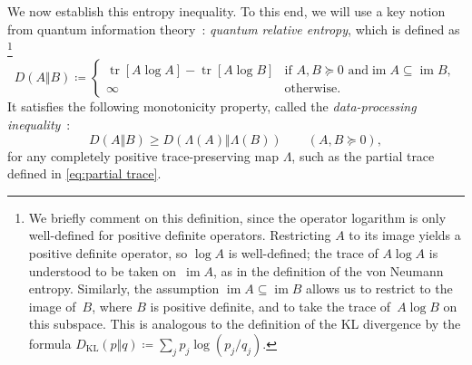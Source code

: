 \documentclass[11pt,letterpaper]{article}
\numberwithin{equation}{section}
\DeclareMathOperator{\tr}{tr}
\begin{document}
We now establish this entropy inequality.
To this end, we will use a key notion from quantum information theory~\cite{watrous}:
\emph{quantum relative entropy}, which is defined as%
\footnote{We briefly comment on this definition, since the operator logarithm is only well-defined for positive definite operators.
Restricting $A$ to its image yields a positive definite operator, so $\log A$ is well-defined; the trace of $A\log A$ is understood to be taken on~$\operatorname{im} A$, as in the definition of the von Neumann entropy.
Similarly, the assumption $\operatorname{im} A \subseteq \operatorname{im} B$ allows us to restrict to the image of~$B$, where $B$ is positive definite, and to take the trace of~$A\log B$ on this subspace.
This is analogous to the definition of the KL divergence by the formula $D_{\text{KL}}(p\Vert q) \coloneqq \sum_j p_j \log(p_j/q_j)$.}
\[
D(A \Vert B) \coloneqq \begin{cases}
    \tr[A\log A] - \tr[A\log B] & \text{if } A, B \succeq 0 \text{ and} \operatorname{im} A \subseteq \operatorname{im} B, \\
    \infty & \text{otherwise}.
\end{cases}
\]
It satisfies the following monotonicity property, called the \emph{data-processing inequality}~\cite[Thm.~5.35]{watrous}:
\begin{equation}\label{eq:dpi}
    D(A \Vert B) \geq D(\Lambda(A) \Vert \Lambda(B))
    \qquad (A, B \succeq 0),
\end{equation}
for any completely positive trace-preserving map $\Lambda$, such as the partial trace defined in \cref{eq:partial trace}.
\end{document}
